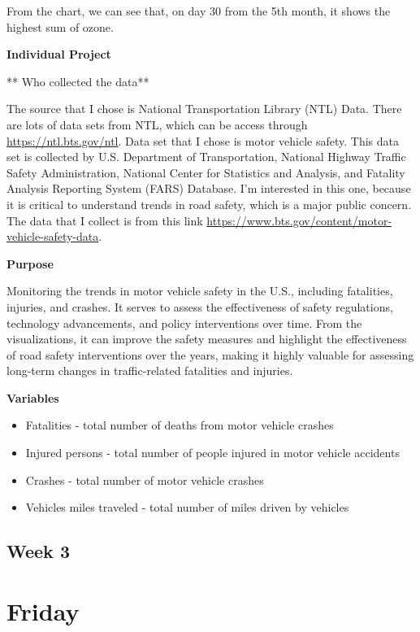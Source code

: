 \documentclass[
  letterpaper,
  DIV=11,
  numbers=noendperiod]{scrreprt}
\begin{document}
From the chart, we can see that, on day 30 from the 5th month, it shows
the highest sum of ozone.

\textbf{Individual Project}

** Who collected the data**

The source that I chose is National Transportation Library (NTL) Data.
There are lots of data sets from NTL, which can be access through
\url{https://ntl.bts.gov/ntl}. Data set that I chose is motor vehicle
safety. This data set is collected by U.S. Department of Transportation,
National Highway Traffic Safety Administration, National Center for
Statistics and Analysis, and Fatality Analysis Reporting System (FARS)
Database. I'm interested in this one, because it is critical to
understand trends in road safety, which is a major public concern. The
data that I collect is from this link
\url{https://www.bts.gov/content/motor-vehicle-safety-data}.

\textbf{Purpose}

Monitoring the trends in motor vehicle safety in the U.S., including
fatalities, injuries, and crashes. It serves to assess the effectiveness
of safety regulations, technology advancements, and policy interventions
over time. From the visualizations, it can improve the safety measures
and highlight the effectiveness of road safety interventions over the
years, making it highly valuable for assessing long-term changes in
traffic-related fatalities and injuries.

\textbf{Variables}

\begin{itemize}
\item
  Fatalities - total number of deaths from motor vehicle crashes
\item
  Injured persons - total number of people injured in motor vehicle
  accidents
\item
  Crashes - total number of motor vehicle crashes
\item
  Vehicles miles traveled - total number of miles driven by vehicles
\end{itemize}

\subsection{Week 3}\label{week-3}

\section{Friday}\label{friday}
\end{document}
